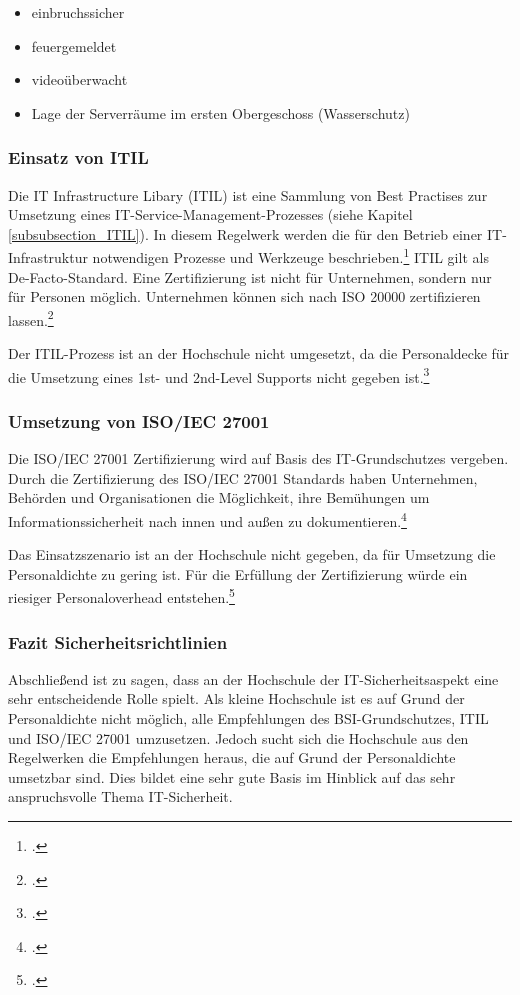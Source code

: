 \begin{itemize}
	\item einbruchssicher
	\item feuergemeldet
	\item videoüberwacht
	\item Lage der Serverräume im ersten Obergeschoss (Wasserschutz)
\end{itemize}

\subsubsection{Einsatz von ITIL}
Die IT Infrastructure Libary (ITIL) ist eine Sammlung von Best Practises zur Umsetzung eines IT-Service-Management-Prozesses (siehe Kapitel \ref{subsubsection_ITIL}). In diesem Regelwerk werden die für den Betrieb einer IT-Infrastruktur notwendigen Prozesse und Werkzeuge beschrieben.\footcite[Vgl.][]{itil_dxperts.de_2015} ITIL gilt als De-Facto-Standard. Eine Zertifizierung ist nicht für Unternehmen, sondern nur für Personen möglich. Unternehmen können sich nach ISO 20000 zertifizieren lassen.\footcite[Vgl.][]{itil_wirtschaftslexikon.gabler}

Der ITIL-Prozess ist an der Hochschule nicht umgesetzt, da die Personaldecke für die Umsetzung eines 1st- und 2nd-Level Supports nicht gegeben ist.\footcite{gunter_muller_interview}

\subsubsection{Umsetzung von ISO/IEC 27001}
Die ISO/IEC 27001 Zertifizierung wird auf Basis des IT-Grundschutzes vergeben. Durch die Zertifizierung des ISO/IEC 27001 Standards haben Unternehmen, Behörden und Organisationen die Möglichkeit, ihre Bemühungen um Informationssicherheit nach innen und außen zu dokumentieren.\footcite[Vgl.][]{iso_27001_bsi.bund.de_2015}

Das Einsatzszenario ist an der Hochschule nicht gegeben, da für Umsetzung die Personaldichte zu gering ist. Für die Erfüllung der Zertifizierung würde ein riesiger Personaloverhead entstehen.\footcite{gunter_muller_interview}

\subsubsection{Fazit Sicherheitsrichtlinien}
Abschließend ist zu sagen, dass an der Hochschule der IT-Sicherheitsaspekt eine sehr entscheidende Rolle spielt. Als kleine Hochschule ist es auf Grund der Personaldichte nicht möglich, alle Empfehlungen des BSI-Grundschutzes, ITIL und ISO/IEC 27001 umzusetzen. Jedoch sucht sich die Hochschule aus den Regelwerken die Empfehlungen heraus, die auf Grund der Personaldichte umsetzbar sind. Dies bildet eine sehr gute Basis im Hinblick auf das sehr anspruchsvolle Thema IT-Sicherheit.